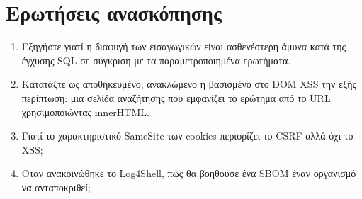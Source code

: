 \section*{Ερωτήσεις ανασκόπησης}
\begin{enumerate}
  \item Εξηγήστε γιατί η διαφυγή των εισαγωγικών είναι ασθενέστερη άμυνα κατά της έγχυσης SQL σε σύγκριση με τα παραμετροποιημένα ερωτήματα.
  \item Κατατάξτε ως αποθηκευμένο, ανακλώμενο ή βασισμένο στο DOM XSS την εξής περίπτωση: μια σελίδα αναζήτησης που εμφανίζει το ερώτημα από το URL χρησιμοποιώντας innerHTML.
  \item Γιατί το χαρακτηριστικό SameSite των cookies περιορίζει το CSRF αλλά όχι το XSS;
  \item Όταν ανακοινώθηκε το Log4Shell, πώς θα βοηθούσε ένα SBOM έναν οργανισμό να ανταποκριθεί;
\end{enumerate}
